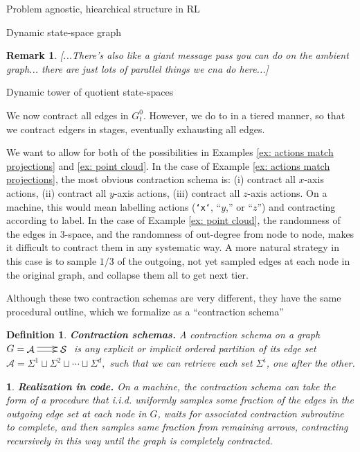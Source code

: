 \documentclass[11pt]{article}
\newtheorem{definition}[subsubsection]{Definition}
\newtheorem{remark}[subsubsection]{Remark}
\newtheorem{ermark}[subsubsection]{}
\begin{document}
\begin{section}{Problem agnostic, hiearchical structure in RL}
\begin{subsection}{Dynamic state-space graph}
\begin{remark}
{\color{blue} [...There's also like a giant message pass you can do on the ambient graph... there are just lots of parallel things we cna do here...]}
\end{remark}



\end{subsection}

\begin{subsection}{Dynamic tower of quotient state-spaces}

We now contract all edges in $G^{0}_{t}$. However, we do to in a tiered manner, so that we contract edgers in stages, eventually exhausting all edges. 

We want to allow for both of the possibilities in Examples \ref{ex: actions match projections} and \ref{ex: point cloud}. In the case of Example \ref{ex: actions match projections}, the most obvious contraction schema is: (i) contract all $x$-axis actions, (ii) contract all $y$-axis actions, (iii) contract all $z$-axis actions. On a machine, this would mean labelling actions (\texttt{`x`}, ``$y$,'' or ``$z$'') and contracting according to label. In the case of Example \ref{ex: point cloud}, the randomness of the edges in $3$-space, and the randomness of out-degree from node to node, makes it difficult to contract them in any systematic way. A more natural strategy in this case is to sample $1/3$ of the outgoing, not yet sampled edges at each node in the original graph, and collapse them all to get next tier.

Although these two contraction schemas are very different, they have the same procedural outline, which we formalize as a ``contraction schema''

\begin{definition}
{\bf Contraction schemas.}
\normalfont
A {\em contraction schema} on a graph $G=\!\!\begin{xy}
(0,0)*+{\mathcal{A}}="1";
(12,0)*+{\mathcal{S}}="2";
{\ar@<2pt> "1"; "2"};
{\ar@<-2pt> "1"; "2"};
\end{xy}$ is any explicit or implicit ordered partition of its edge set
$
\mathcal{A}
=
\Sigma^1 \sqcup \Sigma^2 \sqcup \cdots \sqcup \Sigma^d,
$
such that we can retrieve each set $\Sigma^{i}$, one after the other.
\end{definition}

\begin{ermark}
{\bf Realization in code.}
\normalfont
On a machine, the contraction schema can take the form of a procedure that i.i.d. uniformly samples some fraction of the edges in the outgoing edge set at each node in $G$, waits for associated contraction subroutine to complete, and then samples same fraction from remaining arrows, contracting recursively in this way until the graph is completely contracted.
\end{ermark}


\end{subsection}
\end{section}
\end{document}
